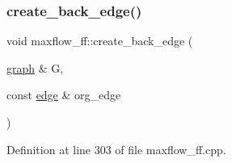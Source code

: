 \subsubsection{\texorpdfstring{create\+\_\+back\+\_\+edge()}{create\_back\_edge()}}
{\footnotesize\ttfamily void maxflow\+\_\+ff\+::create\+\_\+back\+\_\+edge (\begin{DoxyParamCaption}\item[{\mbox{\hyperlink{classgraph}{graph}} \&}]{G,  }\item[{const \mbox{\hyperlink{classedge}{edge}} \&}]{org\+\_\+edge }\end{DoxyParamCaption})\hspace{0.3cm}{\ttfamily [protected]}}



Definition at line 303 of file maxflow\+\_\+ff.\+cpp.


